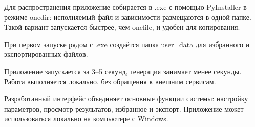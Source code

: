 Для распространения приложение собирается в .exe с помощью PyInstaller в режиме onedir: исполняемый файл и зависимости размещаются в одной папке. Такой вариант запускается быстрее, чем onefile, и удобен для копирования.

При первом запуске рядом с .exe создаётся папка user\_data для избранного и экспортированных файлов.

Приложение запускается за 3--5 секунд, генерация занимает менее секунды. Работа выполняется локально, без обращения к внешним сервисам.

Разработанный интерфейс объединяет основные функции системы: настройку параметров, просмотр результатов, избранное и экспорт. Приложение может использоваться локально на компьютере с Windows.
